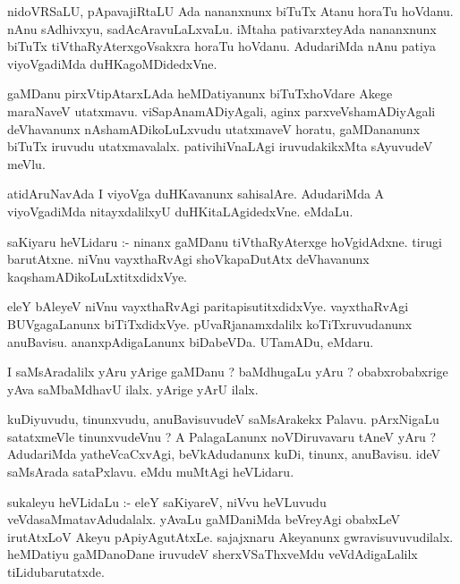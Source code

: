 \documentclass{article}
\begin{document}
\begin{mn}
nidoVRSaLU, pApavajiRtaLU Ada nananxnunx biTuTx Atanu horaTu hoVdanu. nAnu 
sAdhivxyu,  sadAcAravuLaLxvaLu.  iMtaha pativarxteyAda nananxnunx  biTuTx 
tiVthaRyAterxgoVsakxra horaTu hoVdanu.  AdudariMda nAnu patiya viyoVgadiMda duHKagoMDidedxVne.
\end{mn}

\begin{mn}
gaMDanu pirxVtipAtarxLAda  heMDatiyanunx  biTuTxhoVdare Akege maraNaveV  utatxmavu.  
viSapAnamADiyAgali,  aginx parxveVshamADiyAgali deVhavanunx  nAshamADikoLuLxvudu utatxmaveV 
horatu, gaMDananunx biTuTx iruvudu utatxmavalalx.  pativihiVnaLAgi iruvudakikxMta sAyuvudeV meVlu.
\end{mn}

\begin{mn}
atidAruNavAda I viyoVga duHKavanunx sahisalAre.  AdudariMda A viyoVgadiMda 
nitayxdalilxyU duHKitaLAgidedxVne.  eMdaLu.
\end{mn}

\begin{mn}
saKiyaru heVLidaru :- ninanx gaMDanu tiVthaRyAterxge hoVgidAdxne.  tirugi barutAtxne.  
niVnu vayxthaRvAgi shoVkapaDutAtx  deVhavanunx kaqshamADikoLuLxtitxdidxVye.
\end{mn}

\begin{mn}
eleY bAleyeV niVnu vayxthaRvAgi paritapisutitxdidxVye.  vayxthaRvAgi BUVgagaLanunx biTiTxdidxVye.  
pUvaRjanamxdalilx  koTiTxruvudanunx  anuBavisu.  ananxpAdigaLanunx biDabeVDa.   UTamADu,  eMdaru.
\end{mn}

\begin{mn}
I saMsAradalilx  yAru  yArige  gaMDanu ?  baMdhugaLu  yAru ?  obabxrobabxrige yAva saMbaMdhavU ilalx.  yArige yArU ilalx.
\end{mn}

\begin{mn}
kuDiyuvudu, tinunxvudu, anuBavisuvudeV saMsArakekx Palavu. pArxNigaLu satatxmeVle 
tinunxvudeVnu ?  A PalagaLanunx noVDiruvavaru tAneV yAru ?  AdudariMda yatheVcaCxvAgi,  
beVkAdudanunx  kuDi,  tinunx, anuBavisu.  ideV saMsArada sataPxlavu.  eMdu muMtAgi  heVLidaru.
\end{mn}

\begin{mn}
sukaleyu heVLidaLu :- eleY saKiyareV,  niVvu heVLuvudu veVdasaMmatavAdudalalx.  yAvaLu  
gaMDaniMda beVreyAgi obabxLeV irutAtxLoV Akeyu pApiyAgutAtxLe.  sajajxnaru Akeyanunx 
gwravisuvuvudilalx.  heMDatiyu  gaMDanoDane iruvudeV sherxVSaThxveMdu  veVdAdigaLalilx  tiLidubarutatxde.
\end{mn}
\end{document}
